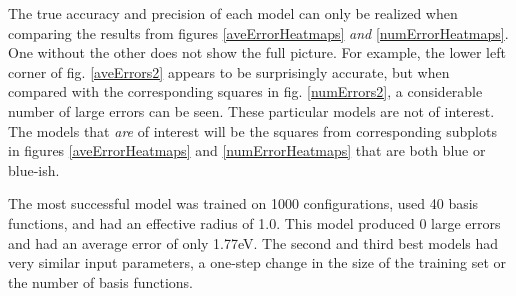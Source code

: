 \par The true accuracy and precision of each model can only be realized when comparing the results from figures \ref{aveErrorHeatmaps} \textit{and} \ref{numErrorHeatmaps}. One without the other does not show the full picture. For example, the lower left corner of fig. \ref{aveErrors2} appears to be surprisingly accurate, but when compared with the corresponding squares in fig. \ref{numErrors2}, a considerable number of large errors can be seen. These particular models are not of interest. The models that \textit{are} of interest will be the squares from corresponding subplots in figures \ref{aveErrorHeatmaps} and \ref{numErrorHeatmaps} that are both blue or blue-ish. 
\par The most successful model was trained on 1000 configurations, used 40 basis functions, and had an effective radius of 1.0. This model produced 0 large errors and had an average error of only 1.77eV. The second and third best models had very similar input parameters, a one-step change in the size of the training set or the number of basis functions.
